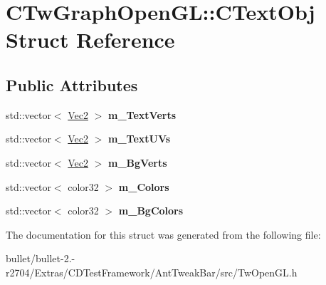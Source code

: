 \hypertarget{struct_c_tw_graph_open_g_l_1_1_c_text_obj}{\section{C\+Tw\+Graph\+Open\+G\+L\+:\+:C\+Text\+Obj Struct Reference}
\label{struct_c_tw_graph_open_g_l_1_1_c_text_obj}
}
\subsection*{Public Attributes}
\begin{DoxyCompactItemize}
\item 
\hypertarget{struct_c_tw_graph_open_g_l_1_1_c_text_obj_a9bf1268c2868d4735b9397f6f32c08dc}{std\+::vector$<$ \hyperlink{struct_c_tw_graph_open_g_l_1_1_vec2}{Vec2} $>$ {\bfseries m\+\_\+\+Text\+Verts}}\label{struct_c_tw_graph_open_g_l_1_1_c_text_obj_a9bf1268c2868d4735b9397f6f32c08dc}

\item 
\hypertarget{struct_c_tw_graph_open_g_l_1_1_c_text_obj_a729f2a07b06a0e972f34723dc069b7b9}{std\+::vector$<$ \hyperlink{struct_c_tw_graph_open_g_l_1_1_vec2}{Vec2} $>$ {\bfseries m\+\_\+\+Text\+U\+Vs}}\label{struct_c_tw_graph_open_g_l_1_1_c_text_obj_a729f2a07b06a0e972f34723dc069b7b9}

\item 
\hypertarget{struct_c_tw_graph_open_g_l_1_1_c_text_obj_a0e586b504957bac164b81918fbfbd533}{std\+::vector$<$ \hyperlink{struct_c_tw_graph_open_g_l_1_1_vec2}{Vec2} $>$ {\bfseries m\+\_\+\+Bg\+Verts}}\label{struct_c_tw_graph_open_g_l_1_1_c_text_obj_a0e586b504957bac164b81918fbfbd533}

\item 
\hypertarget{struct_c_tw_graph_open_g_l_1_1_c_text_obj_ad4ecc1baa1b87e37f2824e4fa115621a}{std\+::vector$<$ color32 $>$ {\bfseries m\+\_\+\+Colors}}\label{struct_c_tw_graph_open_g_l_1_1_c_text_obj_ad4ecc1baa1b87e37f2824e4fa115621a}

\item 
\hypertarget{struct_c_tw_graph_open_g_l_1_1_c_text_obj_aeb89820570eb9cf8b10524e7de3e430b}{std\+::vector$<$ color32 $>$ {\bfseries m\+\_\+\+Bg\+Colors}}\label{struct_c_tw_graph_open_g_l_1_1_c_text_obj_aeb89820570eb9cf8b10524e7de3e430b}

\end{DoxyCompactItemize}


The documentation for this struct was generated from the following file\+:\begin{DoxyCompactItemize}
\item 
bullet/bullet-\/2.-\/r2704/\+Extras/\+C\+D\+Test\+Framework/\+Ant\+Tweak\+Bar/src/Tw\+Open\+G\+L.\+h\end{DoxyCompactItemize}
